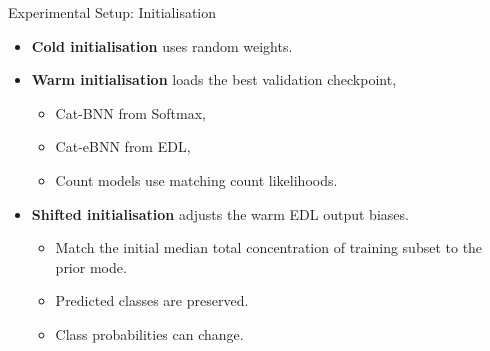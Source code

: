 \begin{frame}{Experimental Setup: Initialisation}
    \label{frm:appendix-setup-initialisation}
    \begin{itemize}
    \setlength{\itemsep}{3mm}
    \item \textbf{Cold initialisation} uses random weights.
    \item \textbf{Warm initialisation} loads the best validation checkpoint,
    \begin{itemize}
    \item Cat-BNN from Softmax,
    \item Cat-eBNN from EDL,
    \item Count models use matching count likelihoods.
    \end{itemize}
    \item \textbf{Shifted initialisation} adjusts the warm EDL output biases.
    \begin{itemize}
    \item Match the initial median total concentration of training subset to the prior mode.
    \item Predicted classes are preserved. 
    \item Class probabilities can change.
    \end{itemize}
    \end{itemize}
    \end{frame}

